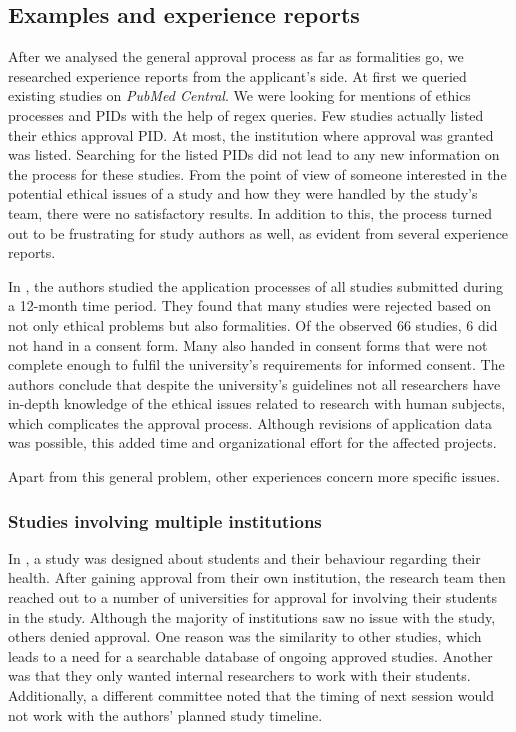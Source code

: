 \documentclass[10pt]{article}
\begin{document}
\subsection{Examples and experience reports}
After we analysed the general approval process as far as formalities go, we researched experience reports from the applicant's side. At first we queried existing studies on \textit{PubMed Central}. We were looking for mentions of ethics processes and PIDs with the help of regex queries. Few studies actually listed their ethics approval PID. At most, the institution where approval was granted was listed. Searching for the listed PIDs did not lead to any new information on the process for these studies. From the point of view of someone interested in the potential ethical issues of a study and how they were handled by the study's team, there were no satisfactory results. 
In addition to this, the process turned out to be frustrating for study authors as well, as evident from several experience reports.

In \cite{example1}, the authors studied the application processes of all studies submitted during a 12-month time period. They found that many studies were rejected based on not only ethical problems but also formalities. Of the observed 66 studies, 6 did not hand in a consent form. Many also handed in consent forms that were not complete enough to fulfil the university's requirements for informed consent. The authors conclude that despite the university's guidelines not all researchers have in-depth knowledge of the ethical issues related to research with human subjects, which complicates the approval process. Although revisions of application data was possible, this added time and organizational effort for the affected projects. 

Apart from this general problem, other experiences concern more specific issues.  

\subsubsection*{Studies involving multiple institutions}
In \cite{rep}, a study was designed about students and their behaviour regarding their health. After gaining approval from their own institution, the research team then reached out to a number of universities for approval for involving their students in the study. 
Although the majority of institutions saw no issue with the study, others denied approval. One reason was the similarity to other studies, which leads to a need for a searchable database of ongoing approved studies. Another was that they only wanted internal researchers to work with their students. Additionally, a different committee noted that the timing of next session would not work with the authors' planned study timeline.\\
\end{document}
